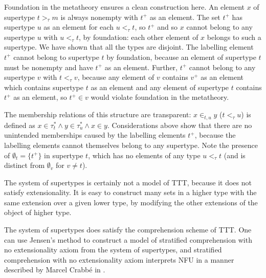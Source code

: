\documentclass[112pt]{article}
\theoremstyle{definition}
\theoremstyle{remark}
\begin{document}
Foundation in the metatheory ensures a clean construction here.  An element $x$ of supertype $t>_\tau m$ is always nonempty with $t^+$ as an element.  The set $t^+$ has supertype $u$ as an element for each $u <_\tau t$, so $t^+$ and so $x$  cannot belong to any supertype $u$ with $u <_\tau t$, by foundation:  each other element of $x$ belongs to such a supertype.  We have shown that all the types are disjoint.  The labelling element $t^+$ cannot belong to supertype $t$ by foundation, because an element of supertype $t$ must be nonempty and have $t^+$ as an element.  Further, $t^+$ cannot belong to any supertype $v$ with $t <_\tau v$, because any element of $v$ contains $v^+$ as an element which contains supertype $t$ as an element and any element of supertype $t$ contains $t^+$ as an element, so $t^+ \in v$ would violate foundation in the metatheory.

The membership relations of this structure are transparent:  $x \in_{t,u} y$ ($t <_\tau u$) is defined as
$x \in \tau^*_t \wedge y \in \tau^*_u \wedge x \in y$.   Considerations above show that there are no unintended memberships caused by the labelling elements $t^+$, because the labelling elements cannot themselves belong to any supertype.  Note the presence of $\emptyset_t = \{t^+\}$ in supertype $t$, which has no elements of any type $u <_\tau t$ (and is distinct from $\emptyset_v$ for $v \neq t$).

The system of supertypes is certainly not a model of TTT, because it does not satisfy extensionality.  It is easy to construct
many sets in a higher type with the same extension over a given lower type, by modifying the other extensions of the object of higher type.

The system of supertypes does satisfy the comprehension scheme of TTT.  One can use Jensen's method to construct a model of stratified comprehension with no extensionality axiom from the system of supertypes, and stratified comprehension with no extensionality axiom interprets NFU in a manner described by Marcel Crabb\'e in \cite{marcelsf}.
\end{document}
